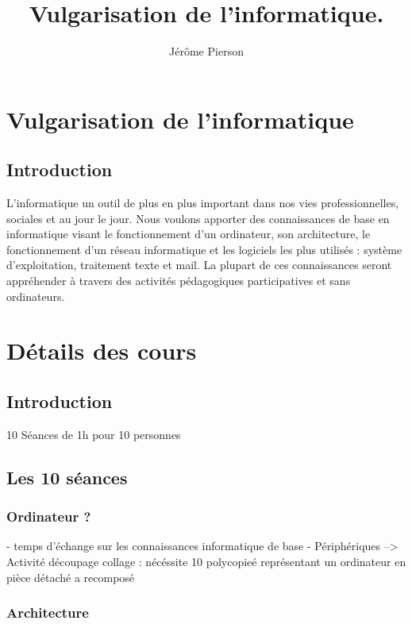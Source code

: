 \documentclass[a4paper,11pt]{report}
\title{Vulgarisation de l'informatique.}
\author{Jérôme Pierson}
\begin{document}
\maketitle

\begin{abstract}
\end{abstract}


\part{Vulgarisation de l'informatique}
\chapter{Introduction}
L'informatique un outil de plus en plus important dans nos vies professionnelles, sociales et au jour le jour. Nous voulons apporter des connaissances de base en informatique visant le fonctionnement d'un ordinateur, son architecture, le fonctionnement d'un réseau informatique et les logiciels les plus utilisés : système d'exploitation, traitement texte et mail. La plupart de ces connaissances seront appréhender à travers des activités pédagogiques participatives et sans ordinateurs. 
\part{Détails des cours}
\chapter{Introduction}



10 Séances de 1h pour 10 personnes
\chapter{Les 10 séances}

\section{Ordinateur ?}

- temps d'échange sur les connaissances informatique de base
- Périphériques
--> Activité découpage collage : nécéssite 10 polycopieé représentant un ordinateur en pièce détaché a recomposé

\section{Architecture}
\end{document}
